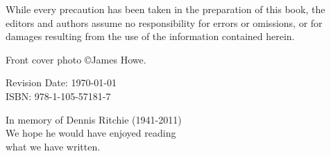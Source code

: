 \vspace{0.15cm}

\noindent While every precaution has been taken in the preparation of this
book, the editors and authors assume no responsibility for errors or omissions,
or for damages resulting from the use of the information contained herein.\\

\vspace{0.15cm}

\noindent Front cover photo \copyright James Howe.

\vspace{1cm}

\noindent Revision Date: \today \\

\noindent ISBN: 978-1-105-57181-7
\normalsize

\newpage

\thispagestyle{empty}

\vspace*{5cm}
\begin{center}
\hspace{0cm}In memory of Dennis Ritchie (1941-2011) \\
We hope he would have enjoyed reading \\
what we have written. 
\end{center}

\newpage

\thispagestyle{empty}
\mbox{}    %

